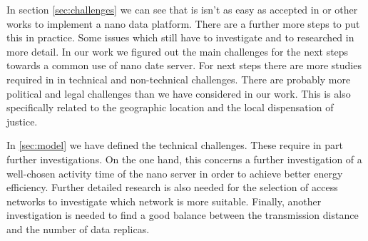 In section \ref{sec:challenges} we can see that is isn't as easy as accepted in \cite{Laoutaris:2008:EEC:1341431.1341442} or other works to implement a nano data platform. There are a further more steps to put this in practice. Some issues which still have to investigate and to researched in more detail. In our work we figured out the main challenges for the next steps towards a common use of nano date server.
For next steps there are more studies required in in technical and non-technical challenges. There are probably more political and legal challenges than we  have considered in our work. This is also specifically related to the geographic location and the local  dispensation of justice.

In \ref{sec:model} we have defined the technical challenges. These require in part further investigations.
On the one hand, this concerns a further investigation of a well-chosen activity time of the nano server in order to achieve better energy efficiency.
Further detailed research is also needed for the selection of access networks to investigate which network is more suitable.
Finally, another investigation is needed to find a good balance between the transmission distance and the number of data replicas.

